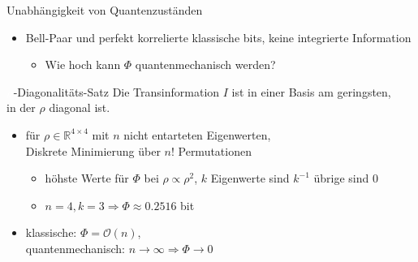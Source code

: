 \begin{frame}{Unabhängigkeit von Quantenzuständen}
	\begin{itemize}
		\item{Bell-Paar und perfekt korrelierte klassische bits,
			  keine integrierte Information}
		\begin{itemize}
			\item{Wie hoch kann $\Phi$ quantenmechanisch werden?}
		\end{itemize}
	\end{itemize}
	\begin{beamerboxesrounded}{$\textcolor{white}{\rho}$-Diagonalitäts-Satz}
		Die Transinformation $I$ ist in einer Basis am geringsten,\\ in der $\rho$
		diagonal ist.
	\end{beamerboxesrounded}
		\begin{itemize}
			\item{für $\rho \in \mathbb{R}^{4\times4}$ mit $n$ nicht entarteten Eigenwerten,\\
				Diskrete Minimierung über $n!$ Permutationen}
			\begin{itemize}
				\item{höhste Werte für $\Phi$ bei $\rho \propto \rho^{2}$,
					  $k$ Eigenwerte sind $k^{-1}$ übrige sind 0}
				\item{$n=4, k=3 \Rightarrow \Phi \approx \num{0.2516}$ bit}
			\end{itemize}
			\item{klassische: $\Phi = \mathcal{O}(n)$,\\ quantenmechanisch: $n \to \infty \Rightarrow \Phi \to 0$  }
		\end{itemize}
\end{frame}